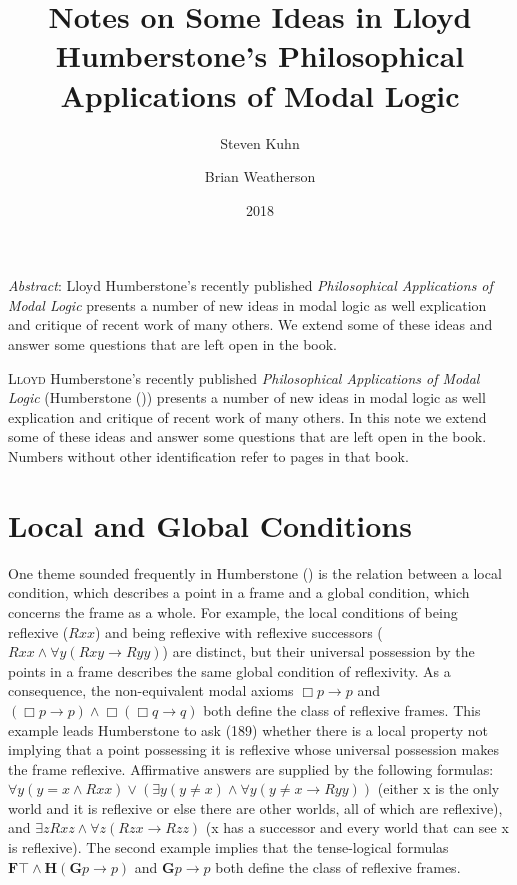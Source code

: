 \documentclass[
  11pt,
  letterpaper,
  DIV=11,
  numbers=noendperiod,
  twoside]{scrartcl}
\title{Notes on Some Ideas in Lloyd Humberstone's Philosophical
Applications of Modal Logic}
\author{Steven Kuhn \and Brian Weatherson}
\date{2018}
\renewenvironment{abstract}
 {\vspace{-1.25cm}
 \quotation\small\noindent\emph{Abstract}:}
 {\endquotation}
\renewenvironment{abstract}
 {\quotation\small\noindent\emph{Abstract}:}
 {\endquotation\vspace{-0.02cm}}
\begin{document}
\maketitle
\begin{abstract}
Lloyd Humberstone's recently published \emph{Philosophical Applications
of Modal Logic} presents a number of new ideas in modal logic as well
explication and critique of recent work of many others. We extend some
of these ideas and answer some questions that are left open in the book.
\end{abstract}


\lettrine{L}{loyd} Humberstone's recently published \emph{Philosophical
Applications of Modal Logic} (Humberstone
()) presents a number of new ideas
in modal logic as well explication and critique of recent work of many
others. In this note we extend some of these ideas and answer some
questions that are left open in the book. Numbers without other
identification refer to pages in that book.

\section{Local and Global Conditions}\label{local-and-global-conditions}

One theme sounded frequently in Humberstone
() is the relation between a local
condition, which describes a point in a frame and a global condition,
which concerns the frame as a whole. For example, the local conditions
of being reflexive (\(Rxx\)) and being reflexive with reflexive
successors (\(Rxx \land \forall y(Rxy \rightarrow Ryy)\)) are distinct,
but their universal possession by the points in a frame describes the
same global condition of reflexivity. As a consequence, the
non-equivalent modal axioms \(\Box p\rightarrow p\) and
\((\Box p\rightarrow p) \land \Box(\Box q\rightarrow q)\) both define
the class of reflexive frames. This example leads Humberstone to ask
(189) whether there is a local property not implying that a point
possessing it is reflexive whose universal possession makes the frame
reflexive. Affirmative answers are supplied by the following formulas:
\(\forall y(y{=}x\wedge Rxx) \vee (\exists y(y\ne x) \wedge \forall y(y\ne x \rightarrow Ryy))\)
(either x is the only world and it is reflexive or else there are other
worlds, all of which are reflexive), and
\(\exists zRxz \wedge \forall z(Rzx \rightarrow Rzz)\) (x has a
successor and every world that can see x is reflexive). The second
example implies that the tense-logical formulas
\({\mathbf{F}}\top \wedge \mathbf{H}(\mathbf{G}p\rightarrow p)\) and
\(\mathbf{G}p\rightarrow p\) both define the class of reflexive frames.
\end{document}
